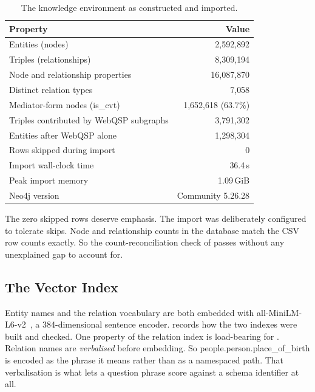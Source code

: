 \begin{table}[!tb]
  \begin{center}
    \caption[The knowledge environment as constructed and imported]{The
    knowledge environment as constructed and imported.}
    \label{tab:graphstats}
    \begin{tabular}{|l|r|}
      \hline
      \textbf{Property} & \textbf{Value} \\
      \hline
      Entities (nodes) & 2{,}592{,}892 \\
      Triples (relationships) & 8{,}309{,}194 \\
      Node and relationship properties & 16{,}087{,}870 \\
      Distinct relation types & 7{,}058 \\
      Mediator-form nodes (\textsf{is\_cvt}) & 1{,}652{,}618 (63.7\%) \\
      \hline
      Triples contributed by WebQSP subgraphs & 3{,}791{,}302 \\
      Entities after WebQSP alone & 1{,}298{,}304 \\
      \hline
      Rows skipped during import & 0 \\
      Import wall-clock time & 36.4\,s \\
      Peak import memory & 1.09\,GiB \\
      Neo4j version & Community 5.26.28 \\
      \hline
    \end{tabular}
  \end{center}
\end{table}

The zero skipped rows deserve emphasis. The import was deliberately configured
to tolerate skips. Node and relationship counts in the database match the CSV
row counts exactly. So the count-reconciliation check of
 passes without any unexplained gap to account for.

\subsection{The Vector Index}\label{sec:vector-index}

Entity names and the relation vocabulary are both embedded with
\textsf{all-MiniLM-L6-v2}~\cite{reimers2019sentence}, a 384-dimensional sentence
encoder.  records how the two indexes were built and
checked. One property of the relation index is load-bearing for
. Relation names are \emph{verbalised} before embedding. So
\textsf{people.person.place\_of\_birth} is encoded as the phrase it means rather
than as a namespaced path. That verbalisation is what lets a question phrase
score against a schema identifier at all.

